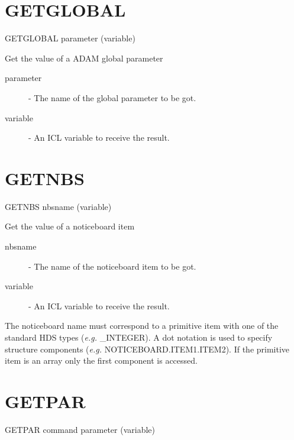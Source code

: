 \section{GETGLOBAL}

   GETGLOBAL \hspace{.5cm}  parameter \hspace{.5cm} (variable)

Get the value of a ADAM global parameter

\begin{description}

\item[parameter] - The name of the global parameter to be got.

\item[variable] - An ICL variable to receive the result.

\end{description}

\section{GETNBS}

   GETNBS \hspace{.5cm}  nbsname \hspace{.5cm} (variable)

Get the value of a noticeboard item

\begin{description}

\item[nbsname] - The name of the noticeboard item to be got.

\item[variable] - An ICL variable to receive the result.

\end{description}                                

The noticeboard name must correspond to a primitive item with one of the
standard HDS types ({\em e.g.} \_INTEGER).
A dot notation is used to specify structure
components ({\em e.g.} NOTICEBOARD.ITEM1.ITEM2). If the primitive item is an array
only the first component is accessed.


\section{GETPAR}

   GETPAR \hspace{.5cm} command \hspace{.5cm} parameter \hspace{.5cm} (variable)

